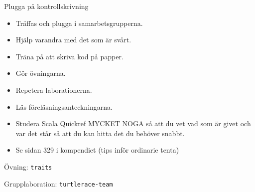 \begin{Slide}{Plugga på kontrollskrivning}
\begin{itemize}
\item Träffas och plugga i samarbetsgrupperna.
\item Hjälp varandra med det som är svårt.
\item Träna på att skriva kod på papper.
\item Gör övningarna.
\item Repetera laborationerna.
\item Läs föreläsningsanteckningarna.
\item Studera Scala Quickref MYCKET NOGA så att du vet vad som är givet och var det står så att du kan hitta det du behöver snabbt.
\item Se sidan 329 i kompendiet (tips inför ordinarie tenta)
\end{itemize}
\end{Slide}









\begin{Slide}{Övning: \texttt{traits}}
\begin{itemize}\SlideFontTiny

\end{itemize}
\end{Slide}

\begin{Slide}{Grupplaboration: \texttt{turtlerace-team}}
\begin{itemize}

\end{itemize}
\end{Slide}



\fi

